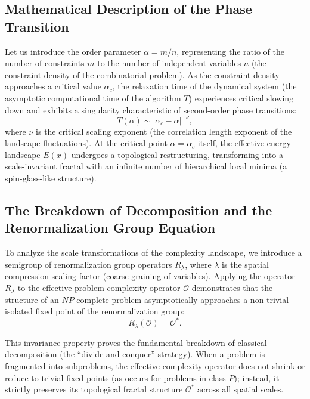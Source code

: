\documentclass[12pt,a4paper]{article}
\begin{document}
\subsection{Mathematical Description of the Phase Transition}

Let us introduce the order parameter $\alpha = m/n$, representing the ratio of the number of constraints $m$ to the number of independent variables $n$ (the constraint density of the combinatorial problem). As the constraint density approaches a critical value $\alpha_c$, the relaxation time of the dynamical system (the asymptotic computational time of the algorithm $T$) experiences critical slowing down and exhibits a singularity characteristic of second-order phase transitions:
\begin{equation}
T(\alpha) \sim |\alpha_c - \alpha|^{-\nu},
\end{equation}
where $\nu$ is the critical scaling exponent (the correlation length exponent of the landscape fluctuations). At the critical point $\alpha = \alpha_c$ itself, the effective energy landscape $E(x)$ undergoes a topological restructuring, transforming into a scale-invariant fractal with an infinite number of hierarchical local minima (a spin-glass-like structure).

\subsection{The Breakdown of Decomposition and the Renormalization Group Equation}

To analyze the scale transformations of the complexity landscape, we introduce a semigroup of renormalization group operators $R_\lambda$, where $\lambda$ is the spatial compression scaling factor (coarse-graining of variables). Applying the operator $R_\lambda$ to the effective problem complexity operator $\mathcal{O}$ demonstrates that the structure of an $NP$-complete problem asymptotically approaches a non-trivial isolated fixed point of the renormalization group:
\begin{equation}
R_\lambda(\mathcal{O}) = \mathcal{O}^*.
\end{equation}

This invariance property proves the fundamental breakdown of classical decomposition (the ``divide and conquer'' strategy). When a problem is fragmented into subproblems, the effective complexity operator does not shrink or reduce to trivial fixed points (as occurs for problems in class $P$); instead, it strictly preserves its topological fractal structure $\mathcal{O}^*$ across all spatial scales.
\end{document}
